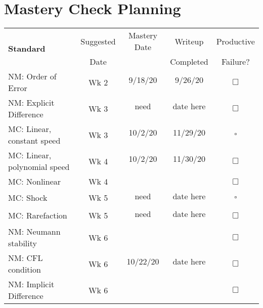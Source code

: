 \documentclass{article}
\newcommand{\checked}{\makebox[0pt][l]{$\checkmark$}$\square$}
\newcommand{\unchecked}{$\Box$}
\begin{document}
\section{Mastery Check Planning}
\begin{tabular}{|l|c|c|c|c} \cline{1-4}
\multirow{2}{5cm}{\textbf{Standard}} & Suggested & Mastery Date & Writeup & Productive  \\ 
& Date & & Completed & Failure? \\ \cline{1-4}
\multirow{2}{5cm}{NM: Order of Error} & \multirow{2}{1.5cm}{Wk 2} & 9/18/20 & 9/26/20 & \multirow{2}{.4cm}{\unchecked} \\ &&&& \\ \cline{1-4}
\multirow{2}{5cm}{NM: Explicit Difference} & \multirow{2}{1.5cm}{Wk 3} & need & date here & \multirow{2}{.4cm}{\unchecked} \\ &&&& \\ \cline{1-4}
\multirow{2}{5cm}{MC: Linear, constant speed}  & \multirow{2}{1.5cm}{Wk 3} & 10/2/20 & 11/29/20 & \multirow{2}{.4cm}{\checked} \\ &&&& \\ \cline{1-4}
\multirow{2}{5cm}{MC: Linear, polynomial speed} & \multirow{2}{1.5cm}{Wk 4} & 10/2/20 & 11/30/20 & \multirow{2}{.4cm}{\unchecked} \\ &&&& \\ \cline{1-4}
\multirow{2}{5cm}{MC: Nonlinear} &\multirow{2}{1.5cm}{Wk 4}&&& \multirow{2}{.4cm}{\unchecked} \\ &&&& \\ \cline{1-4}
\multirow{2}{5cm}{MC: Shock} &\multirow{2}{1.5cm}{Wk 5}& need & date here & \multirow{2}{.4cm}{\checked} \\ &&&& \\ \cline{1-4}
\multirow{2}{5cm}{MC: Rarefaction} & \multirow{2}{1.5cm}{Wk 5}&need & date here &  \multirow{2}{.4cm}{\unchecked} \\ &&&& \\ \cline{1-4}
\multirow{2}{5cm}{NM: Neumann stability} &\multirow{2}{1.5cm}{Wk 6}&&& \multirow{2}{.4cm}{\unchecked} \\ &&&& \\ \cline{1-4}
\multirow{2}{5cm}{NM: CFL condition} &\multirow{2}{1.5cm}{Wk 6} & 10/22/20 & date here &  \multirow{2}{.4cm}{\unchecked} \\ &&&& \\ \cline{1-4}
\multirow{2}{5cm}{NM: Implicit Difference} &\multirow{2}{1.5cm}{Wk 6}&&& \multirow{2}{.4cm}{\unchecked} \\ &&&& \\ \cline{1-4}

\end{tabular}
\end{document}
